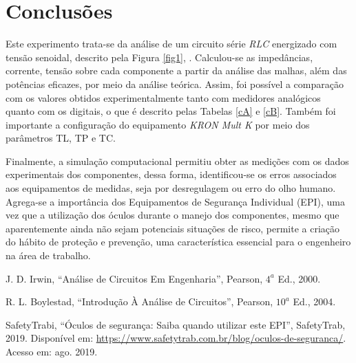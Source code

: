 \documentclass[a4paper,12pt,oneside,openany,table,xcdraw]{article}
\begin{document}
\section{Conclusões} %
Este experimento trata-se da análise de um circuito série \emph{RLC} energizado com tensão senoidal, descrito pela Figura \ref{fig1}, . Calculou-se as impedâncias, corrente, tensão sobre cada componente a partir da análise das malhas, além das potências eficazes, por meio da análise teórica. Assim, foi possível a comparação com os valores obtidos experimentalmente tanto com medidores analógicos quanto com os digitais, o que é descrito pelas Tabelas \ref{cA} e \ref{cB}. Também foi importante a configuração do equipamento \emph{KRON Mult K} por meio dos parâmetros TL, TP e TC. 

Finalmente, a simulação computacional permitiu obter as medições com os dados experimentais dos componentes, dessa forma, identificou-se os erros associados aos equipamentos de medidas, seja por desregulagem ou erro do olho humano. Agrega-se a importância dos Equipamentos de Segurança Individual (EPI), uma vez que a utilização dos óculos durante o manejo dos componentes, mesmo que aparentemente ainda não sejam potenciais situações de risco, permite a criação do hábito de proteção e prevenção, uma característica essencial para o engenheiro na área de trabalho.


\newpage
\begin{thebibliography}{9} 
    J. D. Irwin,
    “Análise de Circuitos Em Engenharia”, Pearson, $4^a$ Ed., 2000.

    R. L. Boylestad,
    “Introdução À Análise de Circuitos”, Pearson, $10^a$ Ed., 2004.

    SafetyTrabi,
    “Óculos de segurança: Saiba quando utilizar este EPI”, SafetyTrab, 2019.
 Disponível em:
 \url{https://www.safetytrab.com.br/blog/oculos-de-seguranca/}. Acesso em: ago. 2019.


\end{thebibliography}
\end{document}
